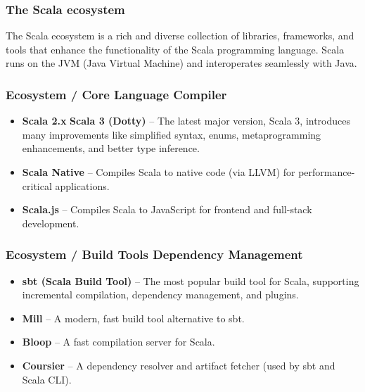 \documentclass{beamer}
\begin{document}

\begin{frame}
\frametitle{The Scala ecosystem }

The Scala ecosystem is a rich and diverse collection of libraries, frameworks, and tools that enhance the functionality of the Scala programming language. Scala runs on the JVM (Java Virtual Machine) and interoperates seamlessly with Java.

\end{frame}


\begin{frame}
\frametitle{Ecosystem / Core Language \text{\&} Compiler }

\begin{itemize}
    \item \textbf{Scala 2.x} \text{\&} \textbf{Scala 3 (Dotty)} – The latest major version, Scala 3, introduces many improvements like simplified syntax, enums, metaprogramming enhancements, and better type inference.
    \item \textbf{Scala Native} – Compiles Scala to native code (via LLVM) for performance-critical applications.
    \item \textbf{Scala.js} – Compiles Scala to JavaScript for frontend and full-stack development.
\end{itemize}

\end{frame}


\begin{frame}
\frametitle{Ecosystem / Build Tools \text{\&} Dependency Management }

\begin{itemize}
    \item \textbf{sbt (Scala Build Tool)} – The most popular build tool for Scala, supporting incremental compilation, dependency management, and plugins.
    \item \textbf{Mill} – A modern, fast build tool alternative to sbt.
    \item \textbf{Bloop} – A fast compilation server for Scala.
    \item \textbf{Coursier} – A dependency resolver and artifact fetcher (used by sbt and Scala CLI).
\end{itemize}

\end{frame}
\end{document}
